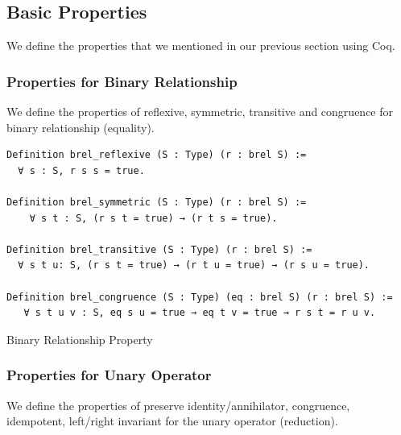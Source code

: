 \documentclass[a4paper,12pt,twoside,openright]{report}
\begin{document}
\subsection{Basic Properties}

We define the properties that we mentioned in our previous section using Coq.

\subsubsection{Properties for Binary Relationship}
We define the properties of reflexive, symmetric, transitive and congruence for binary relationship (equality).

\begin{listing}[H]
\begin{verbatim}
Definition brel_reflexive (S : Type) (r : brel S) :=
  ∀ s : S, r s s = true.

Definition brel_symmetric (S : Type) (r : brel S) := 
    ∀ s t : S, (r s t = true) → (r t s = true). 

Definition brel_transitive (S : Type) (r : brel S) := 
  ∀ s t u: S, (r s t = true) → (r t u = true) → (r s u = true).

Definition brel_congruence (S : Type) (eq : brel S) (r : brel S) := 
   ∀ s t u v : S, eq s u = true → eq t v = true → r s t = r u v.
\end{verbatim}
\caption{Binary Relationship Property} 
\label{coq:def:brel_properties}
\end{listing}

\subsubsection{Properties for Unary Operator}
We define the properties of preserve identity/annihilator, congruence, idempotent, left/right invariant for the unary operator (reduction).
\end{document}
